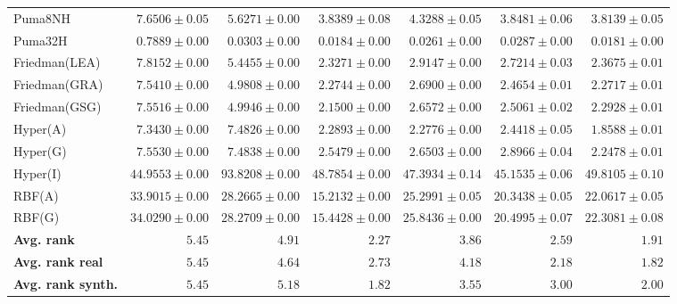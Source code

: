 \begin{table*}[!htbp]
{\begin{tabular}{lrrrrrr}
		Puma8NH & $7.6506 \pm 0.05$ & $5.6271 \pm 0.00$ & $3.8389 \pm 0.08$ & $4.3288 \pm 0.05$ & $3.8481 \pm 0.06$ & $\mathbf{3.8139 \pm 0.05}$\\
		Puma32H & $0.7889 \pm 0.00$ & $0.0303 \pm 0.00$ & $0.0184 \pm 0.00$ & $0.0261 \pm 0.00$ & $0.0287 \pm 0.00$ & $\mathbf{0.0181 \pm 0.00}$\\
		Friedman(LEA) & $7.8152 \pm 0.00$ & $5.4455 \pm 0.00$ & $\mathbf{2.3271 \pm 0.00}$ & $2.9147 \pm 0.00$ & $2.7214 \pm 0.03$ & $2.3675 \pm 0.01$\\
		Friedman(GRA) & $7.5410 \pm 0.00$ & $4.9808 \pm 0.00$ & $2.2744 \pm 0.00$ & $2.6900 \pm 0.00$ & $2.4654 \pm 0.01$ & $\mathbf{2.2717 \pm 0.01}$\\
		Friedman(GSG) & $7.5516 \pm 0.00$ & $4.9946 \pm 0.00$ & $\mathbf{2.1500 \pm 0.00}$ & $2.6572 \pm 0.00$ & $2.5061 \pm 0.02$ & $2.2928 \pm 0.01$\\
		Hyper(A) & $7.3430 \pm 0.00$ & $7.4826 \pm 0.00$ & $2.2893 \pm 0.00$ & $2.2776 \pm 0.00$ & $2.4418 \pm 0.05$ & $\mathbf{1.8588 \pm 0.01}$\\
		Hyper(G) & $7.5530 \pm 0.00$ & $7.4838 \pm 0.00$ & $2.5479 \pm 0.00$ & $2.6503 \pm 0.00$ & $2.8966 \pm 0.04$ & $\mathbf{2.2478 \pm 0.01}$\\
		Hyper(I) & $\mathbf{44.9553 \pm 0.00}$ & $93.8208 \pm 0.00$ & $48.7854 \pm 0.00$ & $47.3934 \pm 0.14$ & $45.1535 \pm 0.06$ & $49.8105 \pm 0.10$\\
		RBF(A) & $33.9015 \pm 0.00$ & $28.2665 \pm 0.00$ & $\mathbf{15.2132 \pm 0.00}$ & $25.2991 \pm 0.05$ & $20.3438 \pm 0.05$ & $22.0617 \pm 0.05$\\
		RBF(G) & $34.0290 \pm 0.00$ & $28.2709 \pm 0.00$ & $\mathbf{15.4428 \pm 0.00}$ & $25.8436 \pm 0.00$ & $20.4995 \pm 0.07$ & $22.3081 \pm 0.08$\\
		\midrule
		\textbf{{Avg. rank}} & $5.45$ & $4.91$ & $2.27$ & $3.86$ & $2.59$ & $\mathbf{1.91}$\\
		\textbf{{Avg. rank real}} & $5.45$ & $4.64$ & $2.73$ & $4.18$ & $2.18$ & $\mathbf{1.82}$\\
		\textbf{{Avg. rank synth.}} & $5.45$ & $5.18$ & $\mathbf{1.82}$ & $3.55$ & $3.00$ & $2.00$\\
		\bottomrule
	\end{tabular}}
\end{table*}
